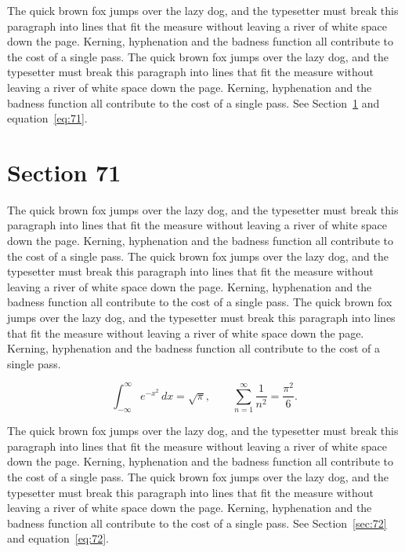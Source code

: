 \documentclass{article}
\begin{document}
The quick brown fox jumps over the lazy dog, and the typesetter must break this paragraph into lines that fit the measure without leaving a river of white space down the page. Kerning, hyphenation and the badness function all contribute to the cost of a single pass. The quick brown fox jumps over the lazy dog, and the typesetter must break this paragraph into lines that fit the measure without leaving a river of white space down the page. Kerning, hyphenation and the badness function all contribute to the cost of a single pass. 
See Section~\ref{sec:71} and equation~\eqref{eq:71}.
\section{Section 71}
\label{sec:71}
The quick brown fox jumps over the lazy dog, and the typesetter must break this paragraph into lines that fit the measure without leaving a river of white space down the page. Kerning, hyphenation and the badness function all contribute to the cost of a single pass. The quick brown fox jumps over the lazy dog, and the typesetter must break this paragraph into lines that fit the measure without leaving a river of white space down the page. Kerning, hyphenation and the badness function all contribute to the cost of a single pass. The quick brown fox jumps over the lazy dog, and the typesetter must break this paragraph into lines that fit the measure without leaving a river of white space down the page. Kerning, hyphenation and the badness function all contribute to the cost of a single pass. 

\begin{equation}\label{eq:71}
\int_{-\infty}^{\infty} e^{-x^{2}}\,dx = \sqrt{\pi}, \qquad
\sum_{n=1}^{\infty} \frac{1}{n^{2}} = \frac{\pi^{2}}{6}.
\end{equation}

The quick brown fox jumps over the lazy dog, and the typesetter must break this paragraph into lines that fit the measure without leaving a river of white space down the page. Kerning, hyphenation and the badness function all contribute to the cost of a single pass. The quick brown fox jumps over the lazy dog, and the typesetter must break this paragraph into lines that fit the measure without leaving a river of white space down the page. Kerning, hyphenation and the badness function all contribute to the cost of a single pass. 
See Section~\ref{sec:72} and equation~\eqref{eq:72}.
\end{document}
